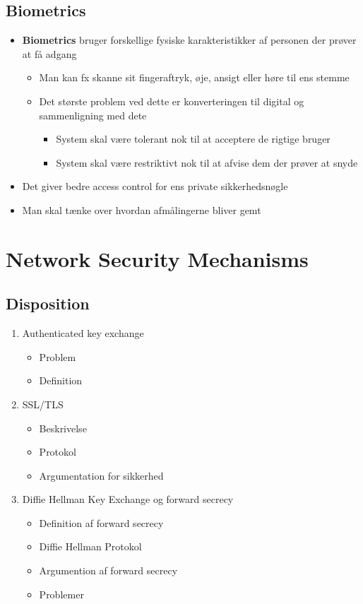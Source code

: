 \documentclass[a4, english]{article}
\begin{document}
\subsection{Biometrics}
\begin{itemize}
	\item \textbf{Biometrics} bruger forskellige fysiske karakteristikker af personen der prøver at få adgang
  \begin{itemize}
  	\item Man kan fx skanne sit fingeraftryk, øje, ansigt eller høre til ens stemme
    \item Det største problem ved dette er konverteringen til digital og sammenligning med dete
    \begin{itemize}
    	\item System skal være tolerant nok til at acceptere de rigtige bruger
      \item System skal være restriktivt nok til at afvise dem der prøver at snyde 
    \end{itemize}   
  \end{itemize}  
  \item Det giver bedre access control for ens private sikkerhedsnøgle 
  \item Man skal tænke over hvordan afmålingerne bliver gemt 
\end{itemize} 

\newpage

\section{Network Security Mechanisms}
\subsection{Disposition}
\begin{enumerate}
	\item Authenticated key exchange
  \begin{itemize}
    \item Problem
  	\item Definition
  \end{itemize}
  \item SSL/TLS
  \begin{itemize}
    \item Beskrivelse
  	\item Protokol
    \item Argumentation for sikkerhed
  \end{itemize}
  \item Diffie Hellman Key Exchange og forward secrecy 
  \begin{itemize}
  	\item Definition af forward secrecy
    \item Diffie Hellman Protokol
    \item Argumention af forward secrecy
    \item Problemer
  \end{itemize}
\end{enumerate}
\newpage
\end{document}
